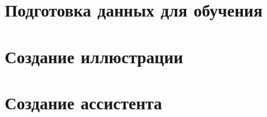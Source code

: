 

\section{Подготовка данных для обучения}



\section{Создание иллюстрации}






\section{Создание ассистента}











